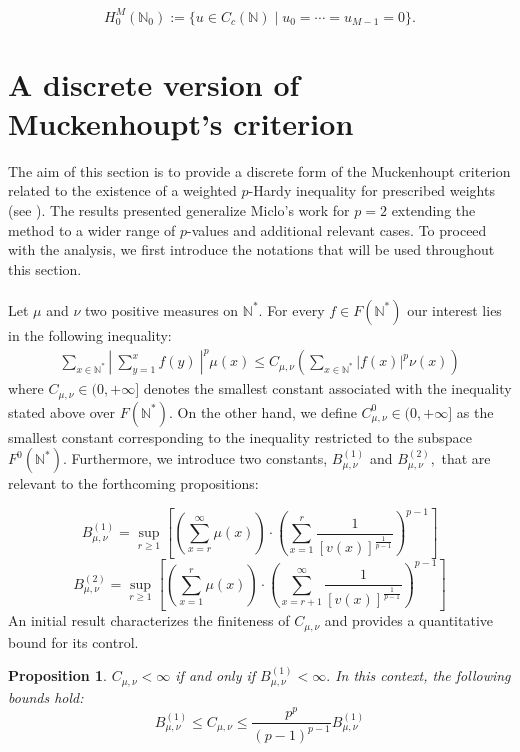 \documentclass[11pt]{amsart}
\newtheorem{prop}[thm]{Proposition}
\newcommand{\1}{[1]}
\begin{document}
\[
H^{M}_{0}(\mathbb{N}_{0}) := \{ u \in C_{c}(\mathbb{N}) \mid u_{0} = \cdots = u_{M-1} = 0 \}.
\]
\newpage
\section{A discrete version of Muckenhoupt's criterion}
The aim of this section is to provide a discrete form of the Muckenhoupt criterion related to the existence of a weighted $p$-Hardy inequality for prescribed weights (see \cite{Muck72}). The results presented generalize Miclo's work \cite{Mic99} for $p=2$ extending the method to a wider range of $p$-values and additional relevant cases. To proceed with the analysis, we first introduce the notations that will be used throughout this section.\\ \\
Let $\mu$ and $\nu$ two positive measures on $\mathbb{N}^{*}.$ For every $f \in F(\mathbb{N}^{*})$
our interest lies in the following inequality:
\begin{align}
\sum_{x \in \mathbb{N}^{*}} \left| \ \sum_{y=1}^{x} f(y) \  \right|^{p} \mu(x) \leq  C_{\mu,\nu} \left( \sum_{x \in \mathbb{N}^{*}} |f(x)|^p \nu(x)\right)  \tag{2.1} \label{eq 2.1}
\end{align}
where $C_{\mu,\nu} \in (0,+\infty]$ denotes the smallest constant associated with the inequality stated above over $F(\mathbb{N}^{*}).$ On the other hand, we define
$C_{\mu,\nu}^{0} \in (0,+\infty]$ as the smallest constant corresponding to the inequality restricted to the subspace $F^{0}(\mathbb{N}^{*}).$ Furthermore, we introduce two constants, $ B_{\mu,\nu}^{(1)}$ and $ B_{\mu,\nu}^{(2)},$ that are relevant to the forthcoming propositions:

$$ B_{\mu,\nu}^{(1)} = \sup_{r \geq 1} \left[ \left( \sum_{x = r}^{\infty} \mu(x) \right) \cdot \left( \sum_{x = 1}^{r} \frac{1}{\left[ v(x) \right]^{\frac{1}{p-1}}} \right)^{p-1} \right]$$ 
$$ B_{\mu,\nu}^{(2)} = \sup_{r \geq 1} \left[ \left( \sum_{x=1}^{r} \mu(x) \right) \cdot \left( \sum_{x =r+1}^{\infty} \frac{1}{\left[ v(x) \right]^{\frac{1}{p-1}}} \right)^{p-1} \right]$$ 
An initial result characterizes the finiteness of $C_{\mu,\nu}$ and provides a quantitative bound for its control.

\begin{prop} \label{Prop 2.1}
$C_{\mu,\nu} < \infty$ if and only if $B_{\mu,\nu}^{(1)}< \infty.$ In this context, the following bounds hold:
$$ B_{\mu,\nu}^{(1)} \leq C_{\mu,\nu} \leq   \frac{p^{p}}{(p-1)^{p-1}} B_{\mu,\nu}^{(1)} $$
\end{prop}
\end{document}

